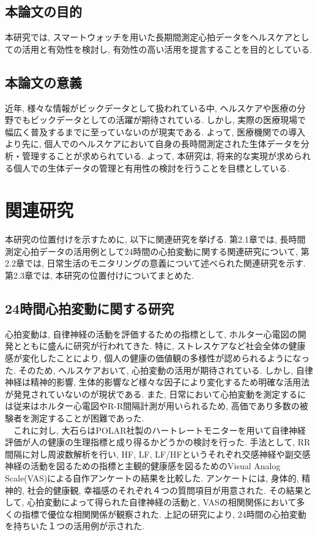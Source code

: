 \documentclass[report, 11pt, a4paper]{jsbook}
\begin{document}
\section{本論文の目的}
本研究では, スマートウォッチを用いた長期間測定心拍データをヘルスケアとしての活用と有効性を検討し, 有効性の高い活用を提言することを目的としている.  

\section{本論文の意義}
近年, 様々な情報がビックデータとして扱われている中, ヘルスケアや医療の分野でもビックデータとしての活躍が期待されている. しかし, 実際の医療現場で幅広く普及するまでに至っていないのが現実である. よって, 医療機関での導入より先に, 個人でのヘルスケアにおいて自身の長時間測定された生体データを分析・管理することが求められている.  
よって, 本研究は, 将来的な実現が求められる個人での生体データの管理と有用性の検討を行うことを目標としている. 


\chapter{関連研究}
本研究の位置付けを示すために, 以下に関連研究を挙げる. 第2.1章では, 長時間測定心拍データの活用例として24時間の心拍変動に関する関連研究について, 第2.2章では, 日常生活のモニタリングの意義について述べられた関連研究を示す. 第2.3章では, 本研究の位置付けについてまとめた.

\section{24時間心拍変動に関する研究}
心拍変動は, 自律神経の活動を評価するための指標として, ホルター心電図の開発とともに盛んに研究が行われてきた. 特に, ストレスケアなど社会全体の健康感が変化したことにより, 個人の健康の価値観の多様性が認められるようになった. そのため, ヘルスケアおいて, 心拍変動の活用が期待されている. しかし, 自律神経は精神的影響, 生体的影響など様々な因子により変化するため明確な活用法が発見されていないのが現状である. 
また, 日常において心拍変動を測定するには従来はホルター心電図やR-R間隔計測が用いられるため, 高価であり多数の被験者を測定することが困難であった.\\
　これに対し, 大石らはPOLAR社製のハートレートモニターを用いて自律神経評価が人の健康の生理指標と成り得るかどうかの検討を行った\cite{subject}. 手法として, RR間隔に対し周波数解析を行い, HF, LF, LF/HFというそれぞれ交感神経や副交感神経の活動を図るための指標と主観的健康感を図るためのVisual Analog Scale(VAS)による自作アンケートの結果を比較した. アンケートには, 身体的, 精神的, 社会的健康観, 幸福感のそれぞれ４つの質問項目が用意された. その結果として, 心拍変動によって得られた自律神経の活動と, VASの相関関係において多くの指標で優位な相関関係が観察された. 上記の研究により, 24時間の心拍変動を持ちいた１つの活用例が示された. 
	
\end{document}
